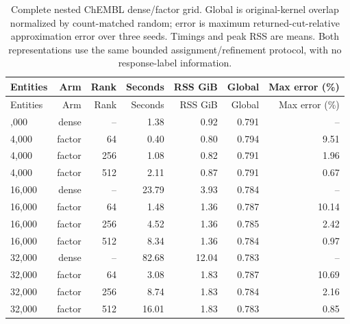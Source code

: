 \begin{longtable}{lrrrrrr}
\caption{Complete nested ChEMBL dense/factor grid. Global is original-kernel overlap normalized by count-matched random; error is maximum returned-cut-relative approximation error over three seeds. Timings and peak RSS are means. Both representations use the same bounded assignment/refinement protocol, with no response-label information.}\\
\toprule
Entities & Arm & Rank & Seconds & RSS GiB & Global & Max error (\%)\\\midrule
\endfirsthead
\toprule
Entities & Arm & Rank & Seconds & RSS GiB & Global & Max error (\%)\\\midrule
\endhead
\midrule\endfoot
\bottomrule\endlastfoot
4,000 & dense & -- & 1.38 & 0.92 & 0.791 & --\\
4,000 & factor & 64 & 0.40 & 0.80 & 0.794 & 9.51\\
4,000 & factor & 256 & 1.08 & 0.82 & 0.791 & 1.96\\
4,000 & factor & 512 & 2.11 & 0.87 & 0.791 & 0.67\\
16,000 & dense & -- & 23.79 & 3.93 & 0.784 & --\\
16,000 & factor & 64 & 1.48 & 1.36 & 0.787 & 10.14\\
16,000 & factor & 256 & 4.52 & 1.36 & 0.785 & 2.42\\
16,000 & factor & 512 & 8.34 & 1.36 & 0.784 & 0.97\\
32,000 & dense & -- & 82.68 & 12.04 & 0.783 & --\\
32,000 & factor & 64 & 3.08 & 1.83 & 0.787 & 10.69\\
32,000 & factor & 256 & 8.74 & 1.83 & 0.784 & 2.16\\
32,000 & factor & 512 & 16.01 & 1.83 & 0.783 & 0.85\\
\end{longtable}
